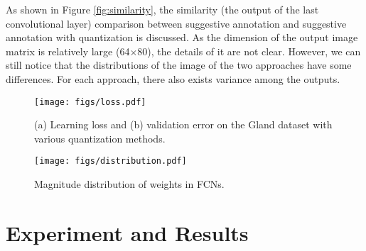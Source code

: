 \documentclass[10pt,twocolumn,letterpaper]{article}
\begin{document}
As shown in Figure \ref{fig:similarity}, the similarity (the output of the last convolutional layer) comparison between suggestive annotation and suggestive annotation with quantization is discussed.
As the dimension of the output image matrix is relatively large (64$\times$80), the details of it are not clear.
However, we can still notice that the distributions of the image of the two approaches have some differences.
For each approach, there also exists variance among the outputs.




\begin{figure}%
\begin{center}
\centerline{\texttt{[image: figs/loss.pdf]}}
\end{center}
\vspace{-20pt}
   \caption{(a) Learning loss and (b) validation error on the Gland dataset with various quantization methods.}
\label{fig:loss}

\end{figure}
\begin{figure}%
\begin{center}
\centerline{\texttt{[image: figs/distribution.pdf]}}
\end{center}
\vspace{-20pt}
   \caption{Magnitude distribution of weights in FCNs.}
\label{fig:distribution}
\end{figure}

\vspace{-1pt}
\section{Experiment and Results}
\end{document}

